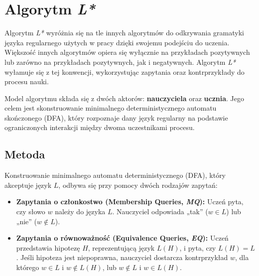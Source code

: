 \newenvironment{observationtable}[1][Tabela Obserwacji]{
  \begin{center}
  \renewcommand{\arraystretch}{1.3}
  \textbf{#1}\vspace{0.5em} \\
  \begin{tabular}{|c|c|c|}
  \hline
}{
  \hline
  \end{tabular}
  \end{center}
}

\section{Algorytm \textit{L*}}
\label{sec:l-star}

Algorytm \textit{L*} \cite{L_STAR} wyróżnia się na tle innych algorytmów do odkrywania gramatyki języka regularnego użytych w pracy dzięki swojemu podejściu do uczenia. Większość innych algorytmów opiera się wyłącznie na przykładach pozytywnych lub zarówno na przykładach pozytywnych, jak i negatywnych. Algorytm \textit{L*} wyłamuje się z tej konwencji, wykorzystując zapytania oraz kontrprzykłady do procesu nauki.

Model algorytmu składa się z dwóch aktorów: \textbf{nauczyciela} oraz \textbf{ucznia}. Jego celem jest skonstruowanie minimalnego deterministycznego automatu skończonego (DFA), który rozpoznaje dany język regularny na podstawie ograniczonych interakcji między dwoma uczestnikami procesu.

\subsection{Metoda}

Konstruowanie minimalnego automatu deterministycznego (DFA), który akceptuje język \( L \), odbywa się przy pomocy dwóch rodzajów zapytań:
\begin{itemize}
    \item \textbf{Zapytania o członkostwo (Membership Queries, \textit{MQ}):} Uczeń pyta, czy słowo \( w \) należy do języka \( L \). Nauczyciel odpowiada „tak” (\( w \in L \)) lub „nie” (\( w \notin L \)).
    \item \textbf{Zapytania o równoważność (Equivalence Queries, \textit{EQ}):} Uczeń przedstawia hipotezę \( H \), reprezentującą język \( L(H) \), i pyta, czy \( L(H) = L \). Jeśli hipoteza jest niepoprawna, nauczyciel dostarcza kontrprzykład \( w \), dla którego \( w \in L \) i \( w \notin L(H) \), lub \( w \notin L \) i \( w \in L(H) \).
\end{itemize}

